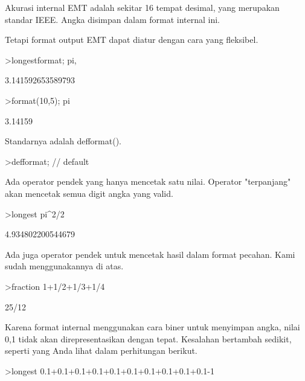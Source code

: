 \documentclass{article}
\begin{document}
\begin{eulernotebook}
\begin{eulercomment}
\begin{eulercomment}
\begin{eulercomment}
Akurasi internal EMT adalah sekitar 16 tempat desimal, yang merupakan
standar IEEE. Angka disimpan dalam format internal ini.

Tetapi format output EMT dapat diatur dengan cara yang fleksibel.
\end{eulercomment}
\begin{eulerprompt}
>longestformat; pi,
\end{eulerprompt}
\begin{euleroutput}
  3.141592653589793
\end{euleroutput}
\begin{eulerprompt}
>format(10,5); pi
\end{eulerprompt}
\begin{euleroutput}
    3.14159 
\end{euleroutput}
\begin{eulercomment}
Standarnya adalah defformat().
\end{eulercomment}
\begin{eulerprompt}
>defformat; // default
\end{eulerprompt}
\begin{eulercomment}
Ada operator pendek yang hanya mencetak satu nilai. Operator
"terpanjang" akan mencetak semua digit angka yang valid.
\end{eulercomment}
\begin{eulerprompt}
>longest pi^2/2
\end{eulerprompt}
\begin{euleroutput}
        4.934802200544679 
\end{euleroutput}
\begin{eulercomment}
Ada juga operator pendek untuk mencetak hasil dalam format pecahan.
Kami sudah menggunakannya di atas.
\end{eulercomment}
\begin{eulerprompt}
>fraction 1+1/2+1/3+1/4
\end{eulerprompt}
\begin{euleroutput}
  25/12
\end{euleroutput}
\begin{eulercomment}
Karena format internal menggunakan cara biner untuk menyimpan angka,
nilai 0,1 tidak akan direpresentasikan dengan tepat. Kesalahan
bertambah sedikit, seperti yang Anda lihat dalam perhitungan berikut.
\end{eulercomment}
\begin{eulerprompt}
>longest 0.1+0.1+0.1+0.1+0.1+0.1+0.1+0.1+0.1+0.1-1
\end{eulerprompt}

\end{eulercomment}
\end{eulercomment}
\end{eulernotebook}
\end{document}
